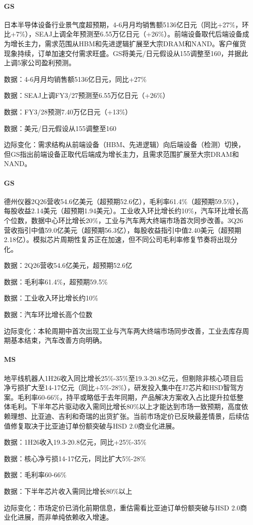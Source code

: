 \documentclass[11pt]{ctexart}
\begin{document}
\paragraph{GS} 日本半导体设备行业景气度超预期，4-6月月均销售额5136亿日元（同比+27\%，环比+7\%），SEAJ上调全年预测至6.55万亿日元（+26\%）。前端设备取代后端设备成为增长主力，需求范围从HBM和先进逻辑扩展至大宗DRAM和NAND。客户催货现象持续，订单加速交付需求旺盛。GS将美元/日元假设从155调整至160，并据此上调5家公司盈利预测。
{\small\color{refgray}数据：4-6月月均销售额5136亿日元，同比+27\%\par}
{\small\color{refgray}数据：SEAJ上调FY3/27预测至6.55万亿日元（+26\%）\par}
{\small\color{refgray}数据：FY3/28预测7.40万亿日元（+13\%）\par}
{\small\color{refgray}数据：美元/日元假设从155调整至160\par}
{\small\color{refgray}边际变化：需求结构从前端设备（HBM、先进逻辑）向后端设备（检测）切换，但GS指出前端设备正取代后端成为增长主力，且需求范围扩展至大宗DRAM和NAND。\par}
\paragraph{GS} 德州仪器2Q26营收54.6亿美元（超预期52.6亿），毛利率61.4\%（超预期59.5\%），每股收益2.14美元（超预期1.94美元）。工业收入环比增长约10\%，汽车环比增长高个位数，数据中心环比增长20\%，工业与汽车两大终端市场首次同步改善。3Q26营收指引中值59.0亿美元（超预期56.3亿），每股收益指引中值2.40美元（超预期2.18亿）。模拟芯片周期性复苏正在加速，但不同公司毛利率修复节奏将出现分化。
{\small\color{refgray}数据：2Q26营收54.6亿美元，超预期52.6亿\par}
{\small\color{refgray}数据：毛利率61.4\%，超预期59.5\%\par}
{\small\color{refgray}数据：工业收入环比增长约10\%\par}
{\small\color{refgray}数据：汽车环比增长高个位数\par}
{\small\color{refgray}边际变化：本轮周期中首次出现工业与汽车两大终端市场同步改善，工业去库存周期基本结束，汽车改善方向明确。\par}
\paragraph{MS} 地平线机器人1H26收入同比增长25\%-35\%至19.3-20.8亿元，但剔除非核心项目后净亏损扩大至14-17亿元（同比+5\%-28\%），研发投入集中在J7芯片和HSD智驾方案。毛利率60-66\%，持平或略低于去年同期，产品解决方案收入占比提升拉低整体毛利。下半年芯片驱动收入需同比增长80\%以上才能达到市场一致预期，高度依赖理想、比亚迪、吉利和奇瑞的出货扩张。当前市场定价已反映最差情景，后续估值修复取决于比亚迪订单份额突破与HSD 2.0商业化进展。
{\small\color{refgray}数据：1H26收入19.3-20.8亿元，同比+25\%-35\%\par}
{\small\color{refgray}数据：核心净亏损14-17亿元，同比扩大5\%-28\%\par}
{\small\color{refgray}数据：毛利率60-66\%\par}
{\small\color{refgray}数据：下半年芯片收入需同比增长80\%以上\par}
{\small\color{refgray}边际变化：市场定价已消化前期信息，重估需看比亚迪订单份额突破与HSD 2.0商业化进展，而非单纯依赖收入增速。\par}
\end{document}
